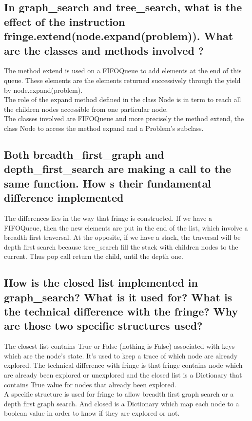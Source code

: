 \documentclass[a4paper,10pt]{article}
\begin{document}
	\subsection{In graph\_search and tree\_search, what is the effect of the instruction fringe.extend(node.expand(problem)). What are the classes and methods involved ?}
	
	The method extend is used on a FIFOQueue to add elements at the end of this queue. These elements are the elements returned successively through the yield by node.expand(problem). \\
	The role of the expand method defined in the class Node is in term to reach all the children nodes accessible from one particular node. \\
	The classes involved are FIFOQueue and more precisely the method extend, the class Node to access the method expand and a Problem's subclass.
	
	\subsection{Both breadth\_first\_graph and depth\_first\_search are making a call to the same function. How s their fundamental difference implemented}
	
	The differences lies in the way that fringe is constructed. If we have a FIFOQueue, then the new elements are put in the end of the list, which involve a breadth first traversal. At the opposite, if we have a stack, the traversal will be depth first search because tree\_search fill the stack with children nodes to the current. Thus pop call return the child, until the depth one.
	
	\subsection{How is the closed list implemented in graph\_search? What is it used for? What
is the technical difference with the fringe? Why are those two specific structures
used?}
	
	The closest list contains True or False (nothing is False) associated with keys which are the node's state. It's used to keep a trace of which node are already explored. The technical difference with fringe is that fringe contains node which are already been explored or unexplored and the closed list is a Dictionary that contains True value for nodes that already been explored. \\ A specific structure is used for fringe to allow breadth first graph search or a depth first graph search. And closed is a Dictionary which map each node to a boolean value in order to know if they are explored or not.
	
\end{document}
